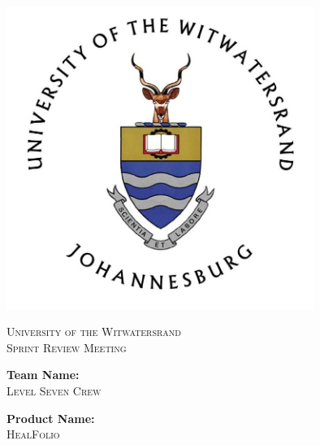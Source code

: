 \documentclass[a4paper]{article}
\begin{document}
\begin{titlepage}

\centering

\vfill

\includegraphics[width=10cm]{Wits-logo1.jpg}

\vskip 0.1cm

\center 

\textsc{\LARGE University of the Witwatersrand}\\[0.5cm] 

\textsc{\Large Sprint Review Meeting} \\[0.5cm] 

\begin{minipage}{0.4\textwidth}

\begin{center} \large

\textbf{Team Name:} \\[0.3cm]

\textsc{Level Seven Crew} \\[0.3cm]

\end{center}

\begin{center} \large

\textbf{Product Name:} \\[0.3cm]

\textsc{HealFolio} \\[0.3cm]

\end{center}

\begin{flushleft} \large


\end{flushleft}
\end{minipage}
\end{titlepage}
\end{document}
